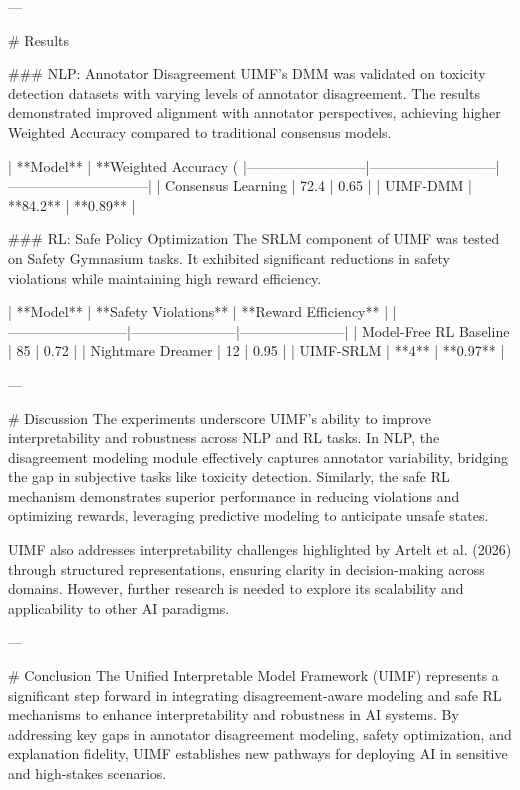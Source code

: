 ---

# Results  

### NLP: Annotator Disagreement  
UIMF's DMM was validated on toxicity detection datasets with varying levels of annotator disagreement. The results demonstrated improved alignment with annotator perspectives, achieving higher Weighted Accuracy compared to traditional consensus models.  

| **Model**                | **Weighted Accuracy (%
|--------------------------|---------------------------|------------------------------|  
| Consensus Learning       | 72.4                     | 0.65                         |  
| UIMF-DMM                 | **84.2**                 | **0.89**                     |  

### RL: Safe Policy Optimization  
The SRLM component of UIMF was tested on Safety Gymnasium tasks. It exhibited significant reductions in safety violations while maintaining high reward efficiency.  

| **Model**                | **Safety Violations** | **Reward Efficiency** |  
|--------------------------|-----------------------|-----------------------|  
| Model-Free RL Baseline   | 85                   | 0.72                  |  
| Nightmare Dreamer        | 12                   | 0.95                  |  
| UIMF-SRLM                | **4**                | **0.97**              |  

---

# Discussion  
The experiments underscore UIMF's ability to improve interpretability and robustness across NLP and RL tasks. In NLP, the disagreement modeling module effectively captures annotator variability, bridging the gap in subjective tasks like toxicity detection. Similarly, the safe RL mechanism demonstrates superior performance in reducing violations and optimizing rewards, leveraging predictive modeling to anticipate unsafe states.

UIMF also addresses interpretability challenges highlighted by Artelt et al. (2026) through structured representations, ensuring clarity in decision-making across domains. However, further research is needed to explore its scalability and applicability to other AI paradigms.

---

# Conclusion  
The Unified Interpretable Model Framework (UIMF) represents a significant step forward in integrating disagreement-aware modeling and safe RL mechanisms to enhance interpretability and robustness in AI systems. By addressing key gaps in annotator disagreement modeling, safety optimization, and explanation fidelity, UIMF establishes new pathways for deploying AI in sensitive and high-stakes scenarios.

